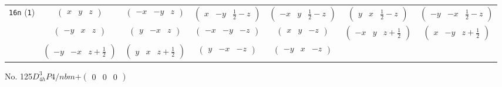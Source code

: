 \documentclass[fleqn,9pt,landscape]{jsarticle}
\begin{document}
\begin{center}
\begin{longtable}{ccccccc}
{\tt 16n} ({\tt 1}) & $ \begin{pmatrix} x & y & z \end{pmatrix} $ & $ \begin{pmatrix} - x & - y & z \end{pmatrix} $ & $ \begin{pmatrix} x & - y & \frac{1}{2} - z \end{pmatrix} $ & $ \begin{pmatrix} - x & y & \frac{1}{2} - z \end{pmatrix} $ & $ \begin{pmatrix} y & x & \frac{1}{2} - z \end{pmatrix} $ & $ \begin{pmatrix} - y & - x & \frac{1}{2} - z \end{pmatrix} $ \\
& $ \begin{pmatrix} - y & x & z \end{pmatrix} $ & $ \begin{pmatrix} y & - x & z \end{pmatrix} $ & $ \begin{pmatrix} - x & - y & - z \end{pmatrix} $ & $ \begin{pmatrix} x & y & - z \end{pmatrix} $ & $ \begin{pmatrix} - x & y & z + \frac{1}{2} \end{pmatrix} $ & $ \begin{pmatrix} x & - y & z + \frac{1}{2} \end{pmatrix} $ \\
& $ \begin{pmatrix} - y & - x & z + \frac{1}{2} \end{pmatrix} $ & $ \begin{pmatrix} y & x & z + \frac{1}{2} \end{pmatrix} $ & $ \begin{pmatrix} y & - x & - z \end{pmatrix} $ & $ \begin{pmatrix} - y & x & - z \end{pmatrix} $ & $  $ & $  $ \\
\end{longtable}
\end{center}
\newpage
No. 125\quad$D_{4h}^{3}$\quad$P4/nbm$\quad[ tetragonal ]\quad$+\begin{pmatrix} 0 & 0 & 0 \end{pmatrix}$
\end{document}
